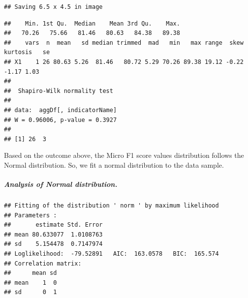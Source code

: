 \documentclass[
]{article}
\newenvironment{Shaded}{\begin{snugshade}}{\end{snugshade}}
\newcommand{\FunctionTok}[1]{\textcolor[rgb]{0.00,0.00,0.00}{#1}}
\newcommand{\NormalTok}[1]{#1}
\newcommand{\OtherTok}[1]{\textcolor[rgb]{0.56,0.35,0.01}{#1}}
\newcommand{\SpecialCharTok}[1]{\textcolor[rgb]{0.00,0.00,0.00}{#1}}
\newcommand{\StringTok}[1]{\textcolor[rgb]{0.31,0.60,0.02}{#1}}
\begin{document}
\begin{verbatim}
## Saving 6.5 x 4.5 in image
\end{verbatim}

\begin{Shaded}
\end{Shaded}

\begin{verbatim}
##    Min. 1st Qu.  Median    Mean 3rd Qu.    Max. 
##   70.26   75.66   81.46   80.63   84.38   89.38 
##    vars  n  mean   sd median trimmed  mad   min   max range  skew kurtosis   se
## X1    1 26 80.63 5.26  81.46   80.72 5.29 70.26 89.38 19.12 -0.22    -1.17 1.03
## 
##  Shapiro-Wilk normality test
## 
## data:  aggDf[, indicatorName]
## W = 0.96006, p-value = 0.3927
## 
## [1] 26  3
\end{verbatim}

Based on the outcome above, the Micro F1 score values distribution follows the Normal distribution. So, we fit a normal distribution to the data sample.

\hypertarget{analysis-of-normal-distribution.-2}{%
\subparagraph{Analysis of Normal distribution.}\label{analysis-of-normal-distribution.-2}}

\begin{Shaded}
\end{Shaded}

\begin{verbatim}
## Fitting of the distribution ' norm ' by maximum likelihood 
## Parameters : 
##       estimate Std. Error
## mean 80.633077  1.0108763
## sd    5.154478  0.7147974
## Loglikelihood:  -79.52891   AIC:  163.0578   BIC:  165.574 
## Correlation matrix:
##      mean sd
## mean    1  0
## sd      0  1
\end{verbatim}
\end{document}
